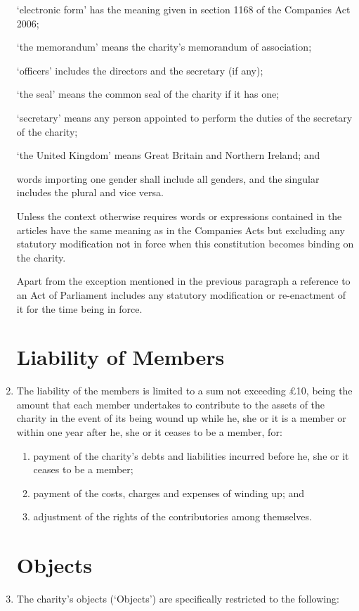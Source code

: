 \documentclass{article}
\begin{document}
\begin{enumerate}[label=\arabic*]
    `electronic form' has the meaning given in section 1168 of the
    Companies Act 2006;
    
    `the memorandum' means the charity's memorandum of association;
    
    `officers' includes the directors and the secretary (if any);
    
    `the seal' means the common seal of the charity if it has one;
    
    `secretary' means any person appointed to perform the duties of the
    secretary of the charity;
    
    `the United Kingdom' means Great Britain and Northern Ireland; and
    
    words importing one gender shall include all genders, and the singular
    includes the plural and vice versa.
    
    Unless the context otherwise requires words or expressions contained
    in the articles have the same meaning as in the Companies Acts but
    excluding any statutory modification not in force when this constitution
    becomes binding on the charity.
    
    Apart from the exception mentioned in the previous paragraph a
    reference to an Act of Parliament includes any statutory modification or
    re-enactment of it for the time being in force.
    \section{Liability of Members}
    \item The liability of the members is limited to a sum not exceeding £10,
    being the amount that each member undertakes to contribute to the
    assets of the charity in the event of its being wound up while he, she
    or it is a member or within one year after he, she or it ceases to be a
    member, for:
    \begin{enumerate}[label=(\arabic*)]
        \item payment of the charity's debts and liabilities incurred before he,
        she or it ceases to be a member;
        \item payment of the costs, charges and expenses of winding up; and
        \item adjustment of the rights of the contributories among themselves.
    \end{enumerate} 
    
    \section{Objects}
    \item The charity's objects (`Objects') are specifically restricted to
    the following:
    

\end{enumerate}
\end{document}

